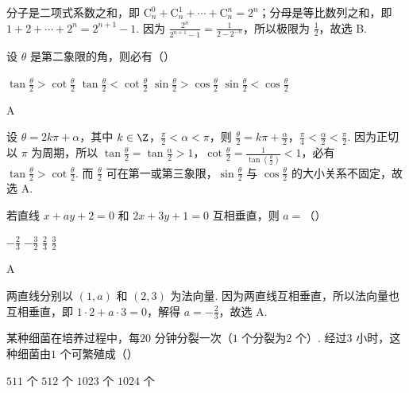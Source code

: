 \begin{solution}
分子是二项式系数之和，即 \(\mathrm C_n^0+\mathrm C_n^1+\cdots+\mathrm C_n^n=2^{n}\)；分母是等比数列之和，即 \(1+2+\cdots+2^{n}=2^{n+1}-1\). 因为 \(\frac{2^{n}}{2^{n+1}-1}=\frac{1}{2-2^{-n}}\)，所以极限为 \(\frac{1}{2}\)，故选 B.
\end{solution}

\begin{problem}
设 \(\theta\) 是第二象限的角，则必有（\quad）

\choices
    {\(\tan\frac{\theta}{2}>\cot\frac{\theta}{2}\)}
    {\(\tan\frac{\theta}{2}<\cot\frac{\theta}{2}\)}
    {\(\sin\frac{\theta}{2}>\cos\frac{\theta}{2}\)}
    {\(\sin\frac{\theta}{2}<\cos\frac{\theta}{2}\)}
\end{problem}

\begin{answer}
A
\end{answer}

\begin{solution}
设 \(\theta=2k\pi+\alpha\)，其中 \(k\in\Z\)，\(\frac{\pi}{2}<\alpha<\pi\)，则 \(\frac{\theta}{2}=k\pi+\frac{\alpha}{2}\)，\(\frac{\pi}{4}<\frac{\alpha}{2}<\frac{\pi}{2}\). 因为正切以 \(\pi\) 为周期，所以 \(\tan\frac{\theta}{2}=\tan\frac{\alpha}{2}>1\)，\(\cot\frac{\theta}{2}=\frac{1}{\tan(\frac{\theta}{2})}<1\)，必有 \(\tan\frac{\theta}{2}>\cot\frac{\theta}{2}\). 而 \(\frac{\theta}{2}\) 可在第一或第三象限，\(\sin\frac{\theta}{2}\) 与 \(\cos\frac{\theta}{2}\) 的大小关系不固定，故选 A.
\end{solution}

\begin{problem}
若直线 \(x+ay+2=0\) 和 \(2x+3y+1=0\) 互相垂直，则 \(a=\)（\quad）

\choices
    {\(-\frac{2}{3}\)}
    {\(-\frac{3}{2}\)}
    {\(\frac{2}{3}\)}
    {\(\frac{3}{2}\)}
\end{problem}

\begin{answer}
A
\end{answer}

\begin{solution}
两直线分别以 \(\left( 1,a \right)\) 和 \(\left( 2,3 \right)\) 为法向量. 因为两直线互相垂直，所以法向量也互相垂直，即 \(1\cdot 2+a\cdot 3=0\)，解得 \(a=-\frac{2}{3}\)，故选 A.
\end{solution}

\begin{problem}
某种细菌在培养过程中，每\(20\text{ 分钟}\)分裂一次（\(1\text{ 个}\)分裂为\(2\text{ 个}\)）. 经过\(3\text{ 小时}\)，这种细菌由\(1\text{ 个}\)可繁殖成（\quad）

\choices
    {\(511\text{ 个}\)}
    {\(512\text{ 个}\)}
    {\(1023\text{ 个}\)}
    {\(1024\text{ 个}\)}
\end{problem}

